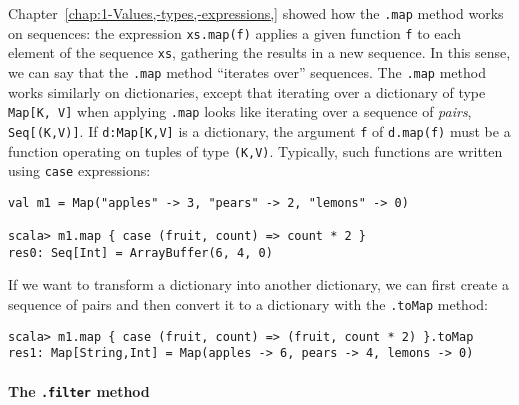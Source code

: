 Chapter~\ref{chap:1-Values,-types,-expressions,} showed how the
\lstinline!.map! method
works on sequences: the expression \lstinline!xs.map(f)!
applies a given function \lstinline!f!
to each element of the sequence \lstinline!xs!,
gathering the results in a new sequence. In this sense, we can say
that the \lstinline!.map!
method ``iterates over'' sequences. The \lstinline!.map!
method works similarly on dictionaries, except that iterating over
a dictionary of type \lstinline!Map[K, V]!
when applying \lstinline!.map!
looks like iterating over a sequence of \emph{pairs}, \lstinline!Seq[(K,V)]!.
If \lstinline!d:Map[K,V]!
is a dictionary, the argument \lstinline!f!
of \lstinline!d.map(f)!
must be a function operating on tuples of type \lstinline!(K,V)!.
Typically, such functions are written using \lstinline!case!
expressions:
\begin{lstlisting}
val m1 = Map("apples" -> 3, "pears" -> 2, "lemons" -> 0)

scala> m1.map { case (fruit, count) => count * 2 }
res0: Seq[Int] = ArrayBuffer(6, 4, 0)
\end{lstlisting}
If we want to transform a dictionary into another dictionary, we can
first create a sequence of pairs and then convert it to a dictionary
with the \lstinline!.toMap!
method:
\begin{lstlisting}
scala> m1.map { case (fruit, count) => (fruit, count * 2) }.toMap
res1: Map[String,Int] = Map(apples -> 6, pears -> 4, lemons -> 0)
\end{lstlisting}

\paragraph*{The \lstinline!.filter!
method }

